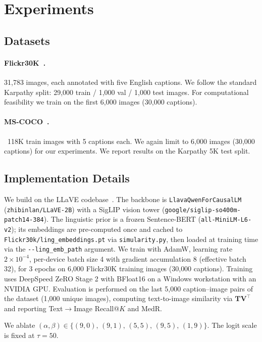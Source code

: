\documentclass[10pt,twocolumn,letterpaper]{article}
\begin{document}
\section{Experiments}

\subsection{Datasets}

\paragraph{Flickr30K~\cite{flickr30k}.}
31,783 images, each annotated with five English captions.
We follow the standard Karpathy split: 29,000 train / 1,000 val / 1,000 test images.
For computational feasibility we train on the first 6,000 images (30,000 captions).

\paragraph{MS-COCO~\cite{mscoco}.}
~118K train images with 5 captions each.
We again limit to 6,000 images (30,000 captions) for our experiments.
We report results on the Karpathy 5K test split.

\subsection{Implementation Details}

We build on the LLaVE codebase~\cite{llave}.
The backbone is \texttt{LlavaQwenForCausalLM} (\texttt{zhibinlan/LLaVE-2B}) with a SigLIP vision tower (\texttt{google/siglip-so400m-patch14-384}).
The linguistic prior is a frozen Sentence-BERT (\texttt{all-MiniLM-L6-v2}); its embeddings are pre-computed once and cached to \texttt{Flickr30k/ling\_embeddings.pt} via \texttt{simularity.py}, then loaded at training time via the \texttt{-{}-ling\_emb\_path} argument.
We train with AdamW, learning rate $2\times10^{-4}$, per-device batch size 4 with gradient accumulation 8 (effective batch 32), for 3 epochs on 6{,}000 Flickr30K training images (30{,}000 captions).
Training uses DeepSpeed ZeRO Stage 2 with BFloat16 on a Windows workstation with an NVIDIA GPU.
Evaluation is performed on the last 5{,}000 caption--image pairs of the dataset (1{,}000 unique images), computing text-to-image similarity via $\mathbf{T}\mathbf{V}^\top$ and reporting Text$\to$Image Recall@$K$ and MedR.

We ablate $(\alpha, \beta) \in \{(9,0),\,(9,1),\,(5,5),\,(9,5),\,(1,9)\}$.
The logit scale is fixed at $\tau{=}50$.
\end{document}
